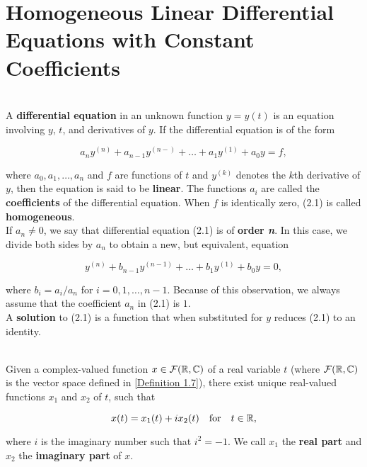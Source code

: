 \section{Homogeneous Linear Differential Equations with Constant Coefficients}

\begin{definition}
	\hfill\\
	A \textbf{differential equation} in an unknown function $y = y(t)$ is an equation involving $y$, $t$, and derivatives of $y$. If the differential equation is of the form
	
	\begin{equation}
		a_ny^{(n)}+a_{n-1}y^{(n-)} + \dots + a_1y^{(1)}+a_0y = f,
	\end{equation}
	
	where $a_0, a_1, \dots, a_n$ and $f$ are functions of $t$ and $y^{(k)}$ denotes the $k$th derivative of $y$, then the equation is said to be \textbf{linear}. The functions $a_i$ are called the \textbf{coefficients} of the differential equation. When $f$ is identically zero, (2.1) is called \textbf{homogeneous}.\\
	
	If $a_n \neq 0$, we say that differential equation (2.1) is of \textbf{order \textit{n}}. In this case, we divide both sides by $a_n$ to obtain a new, but equivalent, equation
	
	\[y^{(n)} + b_{n-1}y^{(n-1)} + \dots + b_1y^{(1)} + b_0y = 0,\]
		
	where $b_i = a_i/a_n$ for $i=0, 1, \dots, n-1$. Because of this observation, we always assume that the coefficient $a_n$ in (2.1) is $1$.\\
	
	A \textbf{solution} to (2.1) is a function that when substituted for $y$ reduces (2.1) to an identity.
\end{definition}

\begin{definition}
	\hfill\\
	Given a complex-valued function $x \in \mathcal{F}(\mathbb{R}, \mathbb{C})$ of a real variable $t$ (where $\mathcal{F}(\mathbb{R}, \mathbb{C})$ is the vector space defined in \autoref{Definition 1.7}), there exist unique real-valued functions $x_1$ and $x_2$ of $t$, such that
	
	\[x(t) = x_1(t) + ix_2(t)\ \ \ \text{for}\ \ \ t \in \R,\]
	
	where $i$ is the imaginary number such that $i^2 = -1$. We call $x_1$ the \textbf{real part} and $x_2$ the \textbf{imaginary part} of $x$.
\end{definition}

